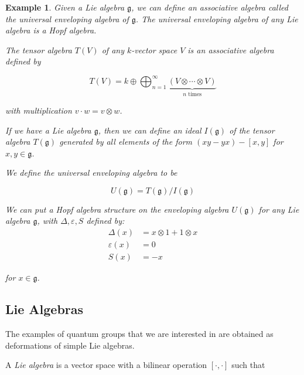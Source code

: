 \documentclass[]{article}
\newtheorem{example}[theorem]{Example}
\numberwithin{equation}{subsection}
\begin{document}
\begin{example}
    Given a Lie algebra $\mathfrak{g}$, we can define an associative algebra
    called the \emph{universal enveloping algebra} of $\mathfrak{g}$. The
    universal enveloping algebra of any Lie algebra is a Hopf algebra.

    The \emph{tensor algebra} $T(V)$ of any $k$-vector space $V$ is an associative
    algebra defined by

    \begin{equation}
        T(V) = k \oplus \bigoplus_{n=1}^\infty \underbrace{(V \otimes \cdots \otimes V)}_{\text{$n$ times}}
    \end{equation}

    with multiplication $v \cdot w = v \otimes w$.


    If we have a Lie algebra $\mathfrak{g}$, then we can define an ideal
    $I(\mathfrak{g})$ of the tensor algebra $T(\mathfrak{g})$ generated by all
    elements of the form $(xy - yx) - \left[ x,y \right]$ for $x,y \in
    \mathfrak{g}$.

    We define the universal enveloping algebra to be 

    \begin{equation}
        U(\mathfrak{g}) = T(\mathfrak{g}) / I(\mathfrak{g})
    \end{equation}

    We can put a Hopf algebra structure on the enveloping algebra
    $U(\mathfrak{g})$ for any Lie algebra $\mathfrak{g}$, with $\Delta,
    \varepsilon, S$ defined by: 
    \begin{align}
        \Delta(x) &= x \otimes 1 + 1 \otimes x \\
        \varepsilon(x) &= 0 \\
        S(x) &= -x  
    \end{align}

    for $x \in \mathfrak{g}$.

\end{example}

\subsection{Lie Algebras}

The examples of quantum groups that we are interested in are obtained as deformations of simple Lie algebras. 

A \emph{Lie algebra} is a vector space with a bilinear operation $\left[ \cdot, \cdot \right]$ such that 
\end{document}
